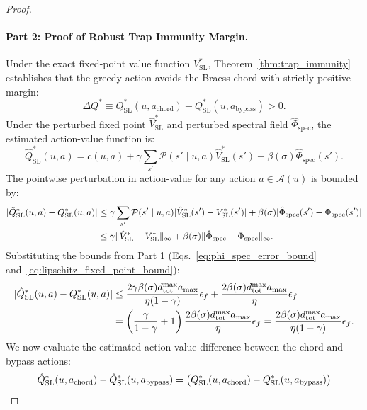 \documentclass[11pt,a4paper]{article}
\begin{document}
\begin{proof}
\paragraph{Part 2: Proof of Robust Trap Immunity Margin.}
Under the exact fixed-point value function $V_{\text{SL}}^*$, Theorem~\ref{thm:trap_immunity} establishes that the greedy action avoids the Braess chord with strictly positive margin:
\begin{equation}
\Delta Q^* \equiv Q_{\text{SL}}^*(u, a_{\text{chord}}) - Q_{\text{SL}}^*(u, a_{\text{bypass}}) > 0.
\end{equation}
Under the perturbed fixed point $\hat{V}_{\text{SL}}^*$ and perturbed spectral field $\hat{\Phi}_{\text{spec}}$, the estimated action-value function is:
\begin{equation}
\hat{Q}_{\text{SL}}^*(u, a) = c(u, a) + \gamma \sum_{s'} \mathcal{P}(s' \mid u, a) \hat{V}_{\text{SL}}^*(s') + \beta(\sigma) \hat{\Phi}_{\text{spec}}(s').
\end{equation}
The pointwise perturbation in action-value for any action $a \in \mathcal{A}(u)$ is bounded by:
\begin{align}
|\hat{Q}_{\text{SL}}^*(u, a) - Q_{\text{SL}}^*(u, a)| &\le \gamma \sum_{s'} \mathcal{P}(s' \mid u, a) |\hat{V}_{\text{SL}}^*(s') - V_{\text{SL}}^*(s')| + \beta(\sigma) |\hat{\Phi}_{\text{spec}}(s') - \Phi_{\text{spec}}(s')| \notag \\
&\le \gamma \|\hat{V}_{\text{SL}}^* - V_{\text{SL}}^*\|_\infty + \beta(\sigma) \|\hat{\Phi}_{\text{spec}} - \Phi_{\text{spec}}\|_\infty.
\end{align}
Substituting the bounds from Part 1 (Eqs.~\eqref{eq:phi_spec_error_bound} and~\eqref{eq:lipschitz_fixed_point_bound}):
\begin{align}
|\hat{Q}_{\text{SL}}^*(u, a) - Q_{\text{SL}}^*(u, a)| &\le \frac{2 \gamma \beta(\sigma) d_{\text{tot}}^{\max} a_{\max}}{\eta (1 - \gamma)} \epsilon_f + \frac{2 \beta(\sigma) d_{\text{tot}}^{\max} a_{\max}}{\eta} \epsilon_f \notag \\
&= \left( \frac{\gamma}{1 - \gamma} + 1 \right) \frac{2 \beta(\sigma) d_{\text{tot}}^{\max} a_{\max}}{\eta} \epsilon_f = \frac{2 \beta(\sigma) d_{\text{tot}}^{\max} a_{\max}}{\eta (1 - \gamma)} \epsilon_f.
\end{align}
We now evaluate the estimated action-value difference between the chord and bypass actions:
\begin{align}
\hat{Q}_{\text{SL}}^*(u, a_{\text{chord}}) - \hat{Q}_{\text{SL}}^*(u, a_{\text{bypass}}) &= \big( Q_{\text{SL}}^*(u, a_{\text{chord}}) - Q_{\text{SL}}^*(u, a_{\text{bypass}}) \big) \notag \\

\end{align}
\end{proof}
\end{document}
